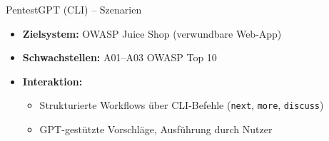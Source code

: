 \documentclass[
	aspectratio=169,	%
	onlytextwidth,		%
	t,					%
	]{beamer}
\begin{document}
\begin{frame}{PentestGPT (CLI) – Szenarien}
	\begin{itemize}
		\item \textbf{Zielsystem:}  
		OWASP Juice Shop (verwundbare Web-App)
		
		\vspace{2mm}
		\item \textbf{Schwachstellen:}  
		A01–A03 OWASP Top 10
		
		\vspace{2mm}
		\item \textbf{Interaktion:}
		\begin{itemize}
			\item Strukturierte Workflows über CLI-Befehle 
			(\texttt{next}, \texttt{more}, \texttt{discuss})
			\item GPT-gestützte Vorschläge, Ausführung durch Nutzer
		\end{itemize}
	\end{itemize}
\end{frame}
\end{document}
